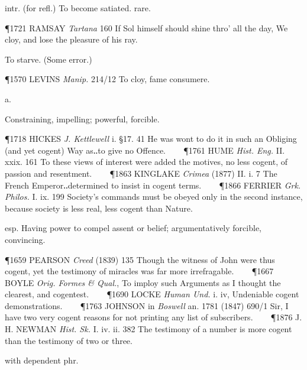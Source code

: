 \begin{description}[wide, labelwidth=!, labelindent=0pt]
\begin{myenumerate}
 intr. (for refl.) To become satiated. rare.

\P 1721 RAMSAY  \textit{Tartana} 160 If Sol himself should shine thro' all the day, We cloy, and lose the pleasure of his ray.

\vspace{0.1cm} \noindent
To starve. (Some error.)

\P 1570 LEVINS  \textit{Manip.} 214/12 To cloy, fame consumere.
\end{myenumerate}


 a.

\noindent {}

\vspace{-0.3cm}

\begin{myenumerate}

 Constraining, impelling; powerful, forcible.

\P 1718 HICKES  \textit{J. Kettlewell} i. §17. 41 He was wont to do it in such an Obliging (and yet cogent) Way as‥to give no Offence.    
\P 1761 HUME  \textit{Hist. Eng.} II. xxix. 161 To these views of interest were added the motives, no less cogent, of passion and resentment.    
\P 1863 KINGLAKE  \textit{Crimea} (1877) II. i. 7 The French Emperor‥determined to insist in cogent terms.    
\P 1866 FERRIER  \textit{Grk. Philos.} I. ix. 199 Society's commands must be obeyed only in the second instance, because society is less real, less cogent than Nature.

 esp. Having power to compel assent or belief; argumentatively forcible, convincing.

\P 1659 PEARSON  \textit{Creed} (1839) 135 Though the witness of John were thus cogent, yet the testimony of miracles was far more irrefragable.    
\P 1667 BOYLE  \textit{Orig. Formes \& Qual.}, To imploy such Arguments as I thought the clearest, and cogentest.    
\P 1690 LOCKE  \textit{Human Und.} i. iv, Undeniable cogent demonstrations.    
\P 1763 JOHNSON in  \textit{Boswell} an. 1781 (1847)  690/1 Sir, I have two very cogent reasons for not printing any list of subscribers.    
\P 1876 J. H. NEWMAN  \textit{Hist. Sk.} I. iv. ii. 382 The testimony of a number is more cogent than the testimony of two or three.

 with dependent phr.


\end{myenumerate}
\end{description}
